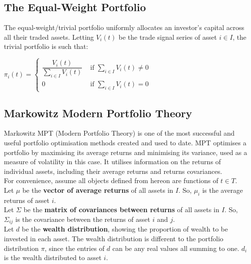 \documentclass[11pt]{article}
\begin{document}
\subsection{The Equal-Weight Portfolio}

The equal-weight/trivial portfolio uniformly allocates an investor's capital across all their traded assets. Letting $V_i(t)$ be the trade signal series of asset $i \in I$, the trivial portfolio is such that:
\begin{center}
    $\pi_i(t) = \begin{cases}
    \dfrac{V_i(t)}{\sum_{i \in I}V_i(t)} & \text{ if } \sum_{i \in I}V_i(t) \neq 0 \\
    0 & \text{ if } \sum_{i \in I}V_i(t) = 0
    \end{cases}$
\end{center}

\subsection{Markowitz Modern Portfolio Theory}

Markowitz MPT (Modern Portfolio Theory) is one of the most successful and useful portfolio optimisation methods created and used to date. MPT optimises a portfolio by maximising its average returns and minimising its variance, used as a measure of volatility in this case. It utilises information on the returns of individual assets, including their average returns and returns covariances.\\

For convenience, assume all objects defined from hereon are functions of $t \in T$.\\

Let $\mu$ be the \textbf{vector of average returns} of all assets in $I$. So, $\mu_{i}$ is the average returns of asset $i$.\\

Let $\Sigma$ be the \textbf{matrix of covariances between returns} of all assets in $I$. So, $\Sigma_{ij}$ is the covariance between the returns of asset $i$ and $j$.\\

Let $d$ be the \textbf{wealth distribution}, showing the proportion of wealth to be invested in each asset. The wealth distribution is different to the portfolio distribution $\pi$, since the entries of $d$ can be any real values all summing to one. $d_i$ is the wealth distributed to asset $i$.\\
\end{document}
